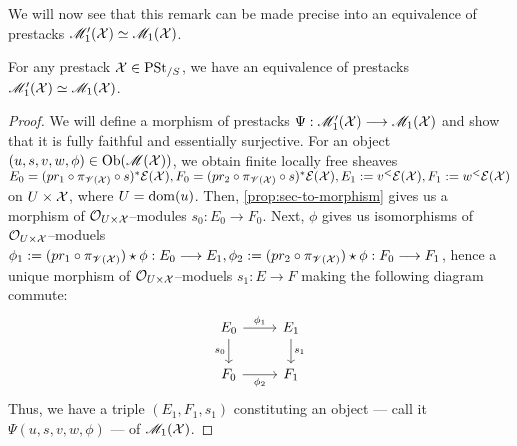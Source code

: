 \documentclass[11pt]{amsart}
\begin{document}
We will now see that this remark can be made precise into an
equivalence of prestacks $\mathscr{M}_1'(\mathcal{X}) \simeq \mathscr{M}_1(\mathcal{X})$.

\begin{thm}\label{thm:arr-bun-arr-sec-equiv}
For any prestack $\mathcal{X} \in \mathrm{PSt}_{/S}$, we have an equivalence of prestacks
$\mathscr{M}_1'(\mathcal{X}) \simeq \mathscr{M}_1(\mathcal{X})$.
\end{thm}
\begin{proof}
We will define a morphism of prestacks
$\Psi : \sM_1'(\mcX) \to \sM_1(\mcX)$ and show that it is fully faithful
and essentially surjective.
For an object $(u, s, v, w, \phi) \in \Ob{\sM(\mcX)}$, we obtain finite locally
free sheaves $E_0 = (pr_1 \circ \pi_{\mathscr{V}(\mathcal{X})} \circ s)^*\mathcal{E}(\mathcal{X}),
F_0 = (pr_2 \circ \pi_{\mathscr{V}(\mathcal{X})} \circ s)^*\mathcal{E}(\mathcal{X}),
E_1 := v^<\mathcal{E}(\mathcal{X}),
F_1 := w^<\mathcal{E}(\mathcal{X})$ on
$U \times \mathcal{X}$, where $U = \mathrm{dom}(u)$. Then, \cref{prop:sec-to-morphism} gives us
a morphism of $\mathcal{O}_{U \times \mathcal{X}}$--modules $s_0 : E_0 \to F_0$. Next, $\phi$
gives us isomorphisms of $\mathcal{O}_{U \times \mathcal{X}}$--moduels
$\phi_1 := (pr_1 \circ \pi_{\sV(\mcX)}) \star \phi : E_0 \to E_1,
\phi_2 := (pr_2 \circ \pi_{\sV(\mcX)}) \star \phi : F_0 \to F_1$, hence a unique
morphism of $\mathcal{O}_{U \times \mathcal{X}}$--moduels $s_1 : E \to F$ making the following
diagram commute:
\[\begin{tikzcd}
E_0 \ar[r, "\phi_1"] \ar[d, "s_0" left] & E_1 \ar[d, "s_1"] \\
F_0 \ar[r, "\phi_2" below] & F_1
\end{tikzcd}\]
Thus, we have a triple $(E_1, F_1, s_1)$ constituting an object --- call it
$\Psi(u, s, v, w, \phi)$ --- of $\mathscr{M}_1(\mathcal{X})$.


\end{proof}
\end{document}
